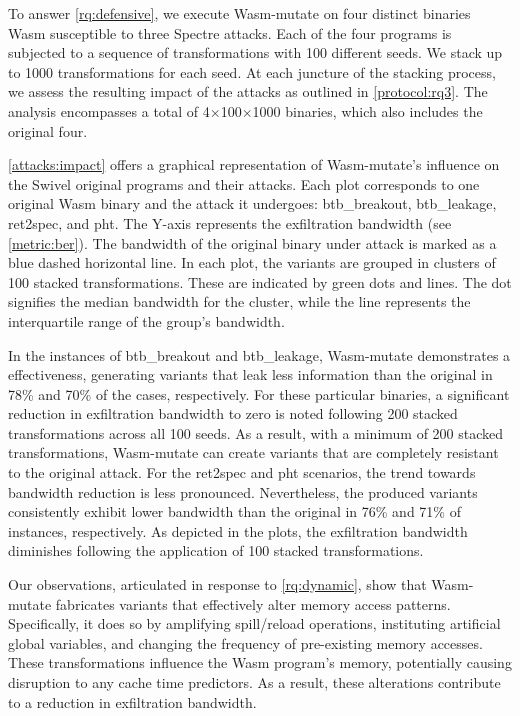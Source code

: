 \documentclass[sigplan,screen]{acmart}
\newcommand{\tool}{Wasm-mutate\xspace}
\newcommand{\wasm}{Wasm\xspace}
\begin{document}
To answer \ref{rq:defensive}, we execute \tool on four distinct binaries \wasm susceptible to three Spectre attacks. Each of the four programs is subjected to a sequence of transformations with 100 different seeds. 
We stack up to 1000 transformations for each seed. 
At each juncture of the stacking process, we assess the resulting impact of the attacks as outlined in \ref{protocol:rq3}. 
The  analysis encompasses a total of 4$\times$100$\times$1000 binaries, which also includes the original four.

\autoref{attacks:impact} offers a graphical representation of \tool's influence on the Swivel original programs and their attacks. 
Each plot corresponds to one original \wasm binary and the attack it undergoes: btb\_breakout, btb\_leakage, ret2spec, and pht.
The Y-axis represents the exfiltration bandwidth (see \autoref{metric:ber}). 
The bandwidth of the original binary under attack is marked as a blue  dashed horizontal line.
In each plot, the variants are grouped in clusters of 100 stacked transformations. 
These are indicated by green dots and lines. 
The dot signifies the median bandwidth for the cluster, while the line represents the interquartile range of the group's bandwidth.



In the instances of btb\_breakout and btb\_leakage, \tool demonstrates a effectiveness, generating variants that leak less information than the original in 78\% and 70\% of the cases, respectively.
For these particular binaries, a significant reduction in exfiltration bandwidth to zero is noted following 200 stacked transformations across all 100 seeds.
As a result, with a minimum of 200 stacked transformations, \tool can create variants that are completely resistant to the original attack.
For the ret2spec and pht scenarios, the trend towards bandwidth reduction is less pronounced.
Nevertheless, the produced variants consistently exhibit lower bandwidth than the original in 76\% and 71\% of instances, respectively.
As depicted in the plots, the exfiltration bandwidth diminishes following the application of 100 stacked transformations.

Our observations, articulated in response to \ref{rq:dynamic}, show that \tool fabricates variants that effectively alter memory access patterns. 
Specifically, it does so by amplifying spill/reload operations, instituting artificial global variables, and changing the frequency of pre-existing memory accesses. 
These transformations influence the \wasm program's memory, potentially causing disruption to any cache time predictors. 
As a result, these alterations contribute to a reduction in exfiltration bandwidth.
\end{document}
